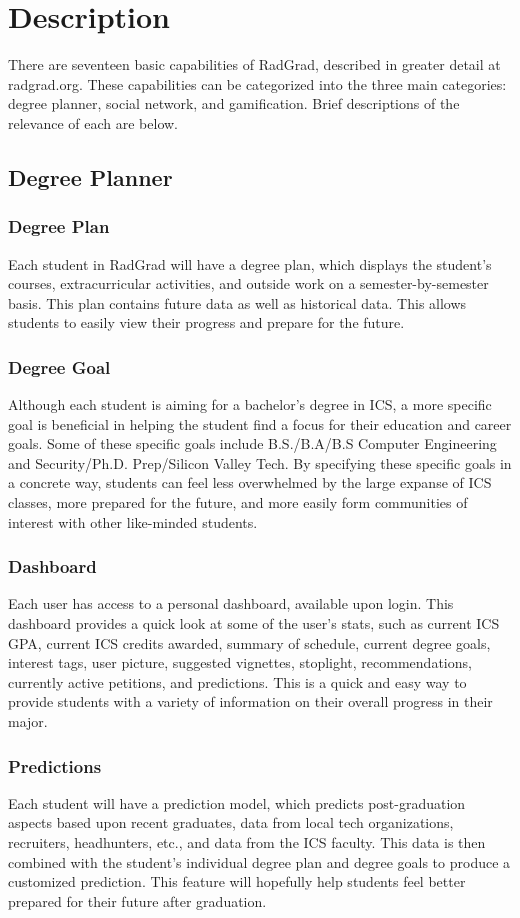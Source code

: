 \chapter{Description}
There are seventeen basic capabilities of RadGrad, described in greater detail at radgrad.org. These capabilities can be categorized into the three main categories: degree planner, social network, and gamification. Brief descriptions of the relevance of each are below.

\section{Degree Planner}
\subsection{Degree Plan}
Each student in RadGrad will have a degree plan, which displays the student's courses, extracurricular activities, and outside work on a semester-by-semester basis. This plan contains future data as well as historical data. This allows students to easily view their progress and prepare for the future. 
\subsection{Degree Goal}
Although each student is aiming for a bachelor's degree in ICS, a more specific goal is beneficial in helping the student find a focus for their education and career goals. Some of these specific goals include B.S./B.A/B.S Computer Engineering and Security/Ph.D. Prep/Silicon Valley Tech. By specifying these specific goals in a concrete way, students can feel less overwhelmed by the large expanse of ICS classes, more prepared for the future, and more easily form communities of interest with other like-minded students.
\subsection{Dashboard}
Each user has access to a personal dashboard, available upon login. This dashboard provides a quick look at some of the user's stats, such as current ICS GPA, current ICS credits awarded, summary of schedule, current degree goals, interest tags, user picture, suggested vignettes, stoplight, recommendations, currently active petitions, and predictions. This is a quick and easy way to provide students with a variety of information on their overall progress in their major. 
\subsection{Predictions}
Each student will have a prediction model, which predicts post-graduation aspects based upon recent graduates, data from local tech organizations, recruiters, headhunters, etc., and data from the ICS faculty. This data is then combined with the student's individual degree plan and degree goals to produce a customized prediction. This feature will hopefully help students feel better prepared for their future after graduation.


